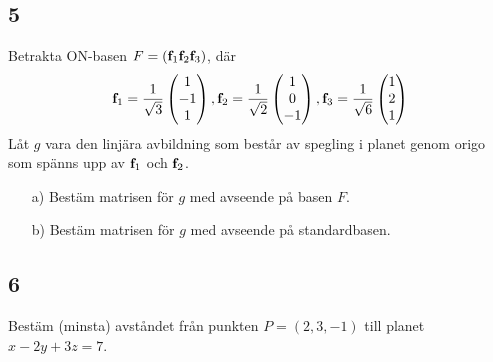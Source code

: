 \documentclass{article}
\begin{document}
\subsection*{5}
Betrakta ON-basen $F = ({\bf f}_1 {\bf f}_2 {\bf f}_3)$, där
$$
    {\bf f}_1 = \frac{1}{\sqrt{3}} 
        \begin{pmatrix}
            1 \\
           -1 \\
            1 \\
        \end{pmatrix}
        ,
    {\bf f}_2 = \frac{1}{\sqrt{2}} 
        \begin{pmatrix}
            1 \\
            0 \\
           -1 \\
        \end{pmatrix}
        ,
    {\bf f}_3 = \frac{1}{\sqrt{6}} 
        \begin{pmatrix}
            1 \\
            2 \\
            1 \\
        \end{pmatrix}
$$
\noindent
Låt $g$  vara den linjära avbildning som består av spegling i planet genom 
origo som spänns upp av ${\bf f}_1$ och ${\bf f}_2$.
\begin{itemize}
    \item[a) ] Bestäm matrisen för $g$ med avseende på basen $F$.
    \item[b) ] Bestäm matrisen för $g$ med avseende på standardbasen.
\end{itemize}

\subsection*{6}
Bestäm (minsta) avståndet från punkten $P=(2,3,-1)$ till planet $x - 2y + 3z = 7$.
\end{document}
